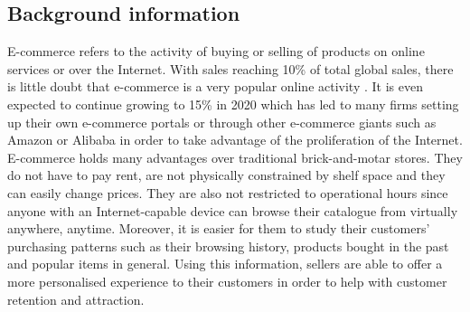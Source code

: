 \documentclass[a4paper]{article}
\begin{document}
\subsection{Background information}
E-commerce refers to the activity of buying or selling of products on online services or over the Internet. With sales reaching 10\% of total global sales, there is little doubt that e-commerce is a very popular online activity \cite{nano3}. It is even expected to continue growing to 15\% in 2020 which has led to many firms setting up their own e-commerce portals or through other e-commerce giants such as Amazon or Alibaba in order to take advantage of the proliferation of the Internet. E-commerce holds many advantages over traditional brick-and-motar stores. They do not have to pay rent, are not physically constrained by shelf space and they can easily change prices. They are also not restricted to operational hours since anyone with an Internet-capable device can browse their catalogue from virtually anywhere, anytime. Moreover, it is easier for them to study their customers' purchasing patterns such as their browsing history, products bought in the past and popular items in general. Using this information, sellers are able to offer a more personalised experience to their customers in order to help with customer retention and attraction.
\newline
\newline
\end{document}
